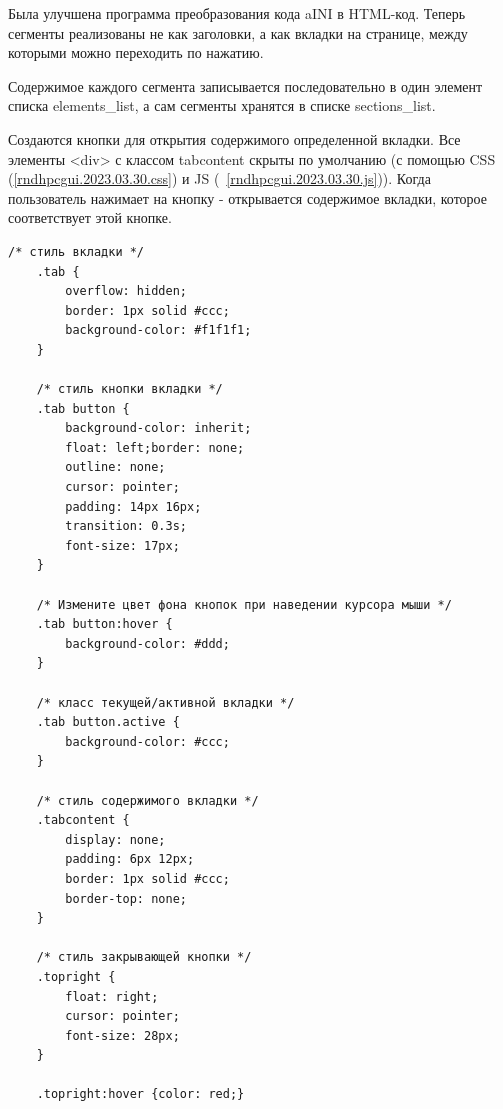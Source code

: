 \def\notedate{2023.03.29}
\def\currentauthor{Василян А.Р. (РК6-83Б)}

Была улучшена программа преобразования кода \textsf{aINI} в \textsf{HTML}-код. Теперь сегменты реализованы не как заголовки, а как вкладки на странице, между которыми  можно переходить по нажатию.

Содержимое каждого сегмента записывается последовательно в один элемент списка \textsf{elements_list}, а сам сегменты хранятся в списке \textsf{sections_list}.  

Создаются кнопки для открытия содержимого определенной вкладки. Все элементы \textsf{<div>} с классом \textsf{tabcontent} скрыты по умолчанию (с помощью \textsf{CSS} (\ref{rndhpcgui.2023.03.30.css}) и \textsf{JS} (~\ref{rndhpcgui.2023.03.30.js})). Когда пользователь нажимает на кнопку - открывается содержимое вкладки, которое соответствует этой кнопке.


\begin{lstlisting}[frame=single, label={rndhpcgui.2023.03.30.css}, caption={CSS стили}, language={HTML}] 
    /* стиль вкладки */
    .tab {
        overflow: hidden;
        border: 1px solid #ccc;
        background-color: #f1f1f1;
    }
    
    /* стиль кнопки вкладки */
    .tab button {
        background-color: inherit;
        float: left;border: none;
        outline: none;
        cursor: pointer;
        padding: 14px 16px;
        transition: 0.3s;
        font-size: 17px;
    }
    
    /* Измените цвет фона кнопок при наведении курсора мыши */
    .tab button:hover {
        background-color: #ddd;
    }
    
    /* класс текущей/активной вкладки */
    .tab button.active {
        background-color: #ccc;
    }
    
    /* стиль содержимого вкладки */
    .tabcontent {
        display: none;
        padding: 6px 12px;
        border: 1px solid #ccc;
        border-top: none;
    }
    
    /* стиль закрывающей кнопки */
    .topright {
        float: right;
        cursor: pointer;
        font-size: 28px;
    }
    
    .topright:hover {color: red;}
\end{lstlisting}


